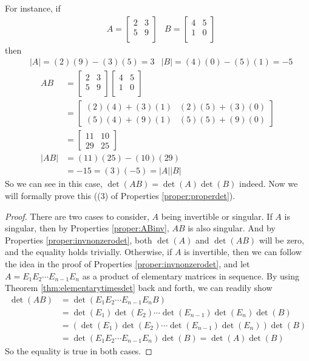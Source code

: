 For instance, if
\begin{align*}
&A = 
\begin{bmatrix}
2 & 3 \\
5 & 9 \\
\end{bmatrix}
&B = 
\begin{bmatrix}
4 & 5 \\
1 & 0 \\
\end{bmatrix}
\end{align*}
then
\begin{align*}
&|A| = (2)(9) - (3)(5) = 3 
&|B| = (4)(0) - (5)(1) = -5
\end{align*}
\begin{align*}
AB &= 
\begin{bmatrix}
2 & 3 \\
5 & 9 \\
\end{bmatrix}
\begin{bmatrix}
4 & 5 \\
1 & 0 \\
\end{bmatrix} \\
&= 
\begin{bmatrix}
(2)(4)+(3)(1) & (2)(5)+(3)(0) \\
(5)(4)+(9)(1) & (5)(5)+(9)(0)
\end{bmatrix} \\
&= 
\begin{bmatrix}
11 & 10 \\
29 & 25
\end{bmatrix} \\
|AB| &= (11)(25) - (10)(29) \\
&= -15 = (3)(-5) = |A||B|
\end{align*}
So we can see in this case, $\det(AB) = \det(A)\det(B)$ indeed. Now we will formally prove this ((3) of Properties \ref{proper:properdet}).
\begin{proof}
There are two cases to consider, $A$ being invertible or singular. If $A$ is singular, then by Properties \ref{proper:ABinv}, $AB$ is also singular. And by Properties \ref{proper:invnonzerodet}, both $\det(A)$ and $\det(AB)$ will be zero, and the equality holds trivially. Otherwise, if $A$ is invertible, then we can follow the idea in the proof of Properties \ref{proper:invnonzerodet}, and let $A = E_{1}E_{2} \cdots E_{n-1}E_n$ as a product of elementary matrices in sequence. By using Theorem \ref{thm:elementarytimesdet} back and forth, we can readily show
\begin{align*}
\det(AB) &= \det(E_{1}E_{2} \cdots E_{n-1}E_nB) \\
&= \det(E_1) \det(E_{2}) \cdots \det(E_{n-1})\det(E_n)\det(B) \\
&= (\det(E_1) \det(E_{2}) \cdots \det(E_{n-1})\det(E_n))\det(B) \\
&= \det(E_{1}E_{2} \cdots E_{n-1}E_n)\det(B) = \det(A)\det(B)
\end{align*}
So the equality is true in both cases.
\end{proof}

